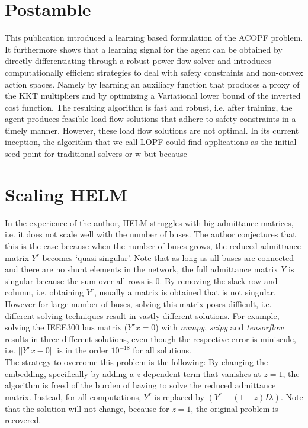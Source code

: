 \documentclass[11pt]{cmuthesis} %
\begin{document}
\section{Postamble}
This publication introduced a learning based formulation of the ACOPF problem. It furthermore shows that a learning signal for the agent can be obtained by directly differentiating through a robust power flow solver and introduces computationally efficient strategies to deal with safety constraints and non-convex action spaces. Namely by learning an auxiliary function that produces a proxy of the KKT multipliers and by optimizing a Variational lower bound of the inverted cost function. The resulting algorithm is fast and robust, i.e. after training, the agent produces feasible load flow solutions that adhere to safety constraints in a timely manner. However, these load flow solutions are not optimal. In its current inception, the algorithm that we call LOPF could find applications as the initial seed point for traditional solvers or w but because






\iffalse
\section{Scaling HELM}
In the experience of the author, HELM struggles with big admittance matrices, i.e. it does not scale well with the number of buses. The author conjectures that this is the case because when the number of buses grows, the reduced admittance matrix $Y^r$ becomes `quasi-singular'. Note that as long as all buses are connected and there are no shunt elements in the network, the full admittance matrix $Y$ is singular because the sum over all rows is 0. By removing the slack row and column, i.e. obtaining $Y^r$, usually a matrix is obtained that is not singular. However for large number of buses, solving this matrix poses difficult, i.e. different solving techniques result in vastly different solutions. For example, solving the IEEE300 bus matrix ($Y^rx = 0$) with \emph{numpy}, \emph{scipy} and \emph{tensorflow} results in three different solutions, even though the respective error is miniscule, i.e. $||Y^rx - 0||$ is in the order $10^{-18}$ for all solutions.\\
The strategy to overcome this problem is the following: By changing the embedding, specifically by adding a $z$-dependent term that vanishes at $z=1$, the algorithm is freed of the burden of having to solve the reduced admittance matrix. Instead, for all computations, $Y^r$ is replaced by $(Y^r + (1-z)I\lambda)$. Note that the solution will not change, because for $z=1$, the original problem is recovered.
\end{document}
